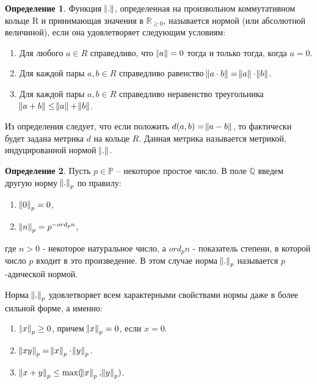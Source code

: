 \documentclass[master, och, diploma, times]{sty/SCWorks}
\theoremstyle{plain}
\theoremstyle{definition}
\newtheorem{defn}{Определение}[section]
\numberwithin{equation}{section}
\begin{document}
\begin{defn}
Функция $\norm{.}$, определенная на произвольном коммутативном кольце R и принимающая значения в $\mathbb {R}_{\ge 0}$, называется нормой (или абсолютной величиной), если она удовлетворяет следующим условиям:

\begin{enumerate}
	\item Для любого $a \in R$ справедливо, что $\norm{a}=0$ тогда и только тогда, когда $a=0$.
	\item Для каждой пары $a, b \in R$ справедливо равенство $\norm{a \cdot b} = \norm{a} \cdot \norm{b}$.
	\item Для каждой пары $a, b \in R$ справедливо неравенство треугольника $\norm{a + b} \le \norm{a} + \norm{b}$.
\end{enumerate}
\end{defn}

Из определения следует, что если положить $d(a, b)= \norm{a - b}$, то фактически будет задана метрика $d$ на кольце $R$. Данная метрика называется метрикой, индуцированной нормой $\norm{.}$.

\begin{defn}
Пусть $p \in \mathbb {P}$ -- некоторое простое число. В поле $\mathbb {Q}$ введем другую норму $\norm{.}_p$ по правилу:

\begin{enumerate}
	\item $\norm{0}_p = 0$,
	\item $\norm{n}_p = p ^ {-ord_pn}$,
\end{enumerate}

\noindent где $n > 0$ - некоторое натуральное число, а $ord_pn$ - показатель степени, в которой число $p$ входит в это произведение. В этом случае норма $\norm{.}_p$ называется \mbox{$p$-адической} нормой.
\end{defn}

Норма $\norm{.}_p$  удовлетворяет всем характерными свойствами нормы даже в более сильной форме, а именно:

\begin{enumerate}
	\item $\norm{x}_p \ge 0$, причем $\norm{x}_p = 0$, если $x = 0$.
	\item $\norm{xy}_p = \norm{x}_p \cdot \norm{y}_p$.
	\item $\norm{x + y}_p \le \max(\norm{x}_p, \norm{y}_p)$\cite{bib:analysis:volovich}.
\end{enumerate}
\end{document}
